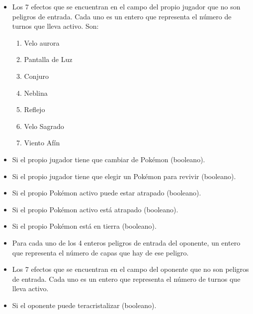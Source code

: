 \begin{itemize}
\begin{enumerate}
              \item Púas
              \item Trampa Rocas
              \item Red viscosa
              \item Púas Tóxicas
          \end{enumerate}
    \item Los 7 efectos que se encuentran en el campo del propio jugador que no son peligros de entrada. Cada uno es un entero que representa el número de turnos que lleva activo. Son:
          \begin{enumerate}
              \item Velo aurora
              \item Pantalla de Luz
              \item Conjuro
              \item Neblina
              \item Reflejo
              \item Velo Sagrado
              \item Viento Afín
          \end{enumerate}
    \item Si el propio jugador tiene que cambiar de Pokémon (booleano).
    \item Si el propio jugador tiene que elegir un Pokémon para revivir (booleano).
    \item Si el propio Pokémon activo puede estar atrapado (booleano).
    \item Si el propio Pokémon activo está atrapado (booleano).
    \item Si el propio Pokémon está en tierra (booleano).
    \item Para cada uno de los 4 enteros peligros de entrada del oponente, un entero que representa el número de capas que hay de ese peligro.
    \item Los 7 efectos que se encuentran en el campo del oponente que no son peligros de entrada. Cada uno es un entero que representa el número de turnos que lleva activo.
    \item Si el oponente puede teracristalizar (booleano).
\end{itemize}

